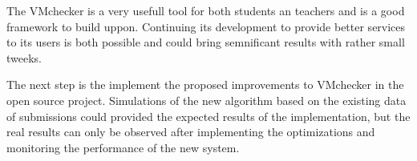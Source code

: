 
The VMchecker is a very usefull tool for both students an teachers and is a
good framework to build uppon. Continuing its development to provide better
services to its users is both possible and could bring semnificant results
with rather small tweeks.

The next step is the implement the proposed improvements to VMchecker in
the open source project. Simulations of the new algorithm based on the
existing data of submissions could provided the expected results of the
implementation, but the real results can only be observed after
implementing the optimizations and monitoring the performance of the new
system.
